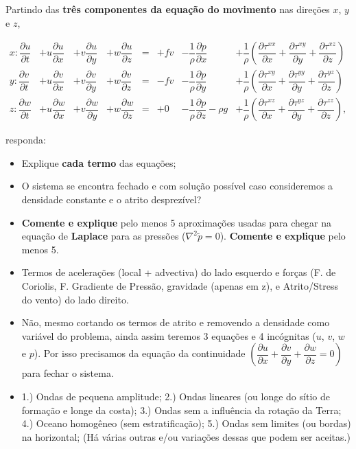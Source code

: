 \documentclass[letterpaper,portuguese,12pt,pdftex]{exam}
\newcommand{\pd}[2]{\dfrac{\partial #1}{\partial #2}}
\begin{document}
\begin{questions}

\question[8]
Partindo das {\bf três componentes da equação do movimento} nas direções
$x$, $y$ e $z$,

\begin{align*}
x: \pd{u}{t} &+ u\pd{u}{x} &+ v\pd{u}{y} &+ w\pd{u}{z} &= &+ fv &- \dfrac{1}{\rho}\pd{p}{x}         &+ \dfrac{1}{\rho}\left(\pd{\tau^{xx}}{x} + \pd{\tau^{xy}}{y} + \pd{\tau^{xz}}{z}\right) \\
y: \pd{v}{t} &+ u\pd{v}{x} &+ v\pd{v}{y} &+ w\pd{v}{z} &= &- fv &- \dfrac{1}{\rho}\pd{p}{y}         &+ \dfrac{1}{\rho}\left(\pd{\tau^{xy}}{x} + \pd{\tau^{yy}}{y} + \pd{\tau^{yz}}{z}\right) \\
z: \pd{w}{t} &+ u\pd{w}{x} &+ v\pd{w}{y} &+ w\pd{w}{z} &= &+  0 &- \dfrac{1}{\rho}\pd{p}{z} -\rho g &+ \dfrac{1}{\rho}\left(\pd{\tau^{xz}}{x} + \pd{\tau^{yz}}{y} + \pd{\tau^{zz}}{z}\right),
\end{align*}

responda:
\begin{itemize}
  \item Explique {\bf cada termo} das equações;
  \item O sistema se encontra fechado e com solução possível caso
        consideremos a densidade constante e o atrito desprezível?
  \item {\bf Comente e explique} pelo menos 5 aproximações usadas para chegar
        na equação de {\bf Laplace} para as pressões ($\nabla^2 \tilde{p}= 0$).
        {\bf Comente e explique} pelo menos 5.
\end{itemize}


\begin{solution}
  \begin{itemize}
    \item Termos de acelerações (local + advectiva) do lado esquerdo e forças
          (F. de Coriolis, F. Gradiente de Pressão, gravidade (apenas em z), e
          Atrito/Stress do vento) do lado direito.
    \item Não, mesmo cortando os termos de atrito e removendo a densidade como
          variável do problema, ainda assim teremos 3 equações e 4 incógnitas
          ($u$, $v$, $w$ e $p$).  Por isso precisamos da equação da continuidade
          $\left( \pd{u}{x} + \pd{v}{y} + \pd{w}{z} = 0 \right)$ para fechar o
          sistema.
    \item 1.) Ondas de pequena amplitude; 2.) Ondas lineares (ou longe do sítio
          de formação e longe da costa); 3.) Ondas sem a influência da rotação da
          Terra; 4.) Oceano homogêneo (sem estratificação); 5.) Ondas sem
          limites (ou bordas) na horizontal; (Há várias outras e/ou variações
          dessas que podem ser aceitas.)
  \end{itemize}
\end{solution}


\end{questions}
\end{document}
